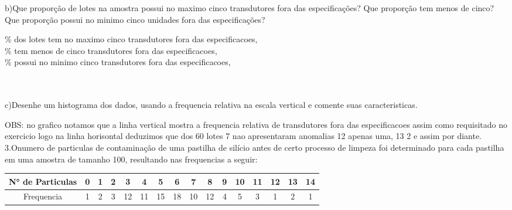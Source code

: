 \documentclass[12pt]{article}%
\begin{document}
 \color[rgb]{0.2,0.2,0.2}
  b)Que proporção de lotes na amostra possui no maximo cinco transdutores fora
 das especificações? Que proporção tem menos de cinco? Que proporção possui
 no minimo cinco unidades fora das especificações?\\
 \color[rgb]{0.6,0.2,0.2}
 
 \pgfmathresult\% dos lotes tem no maximo cinco transdutores fora das especificacoes, \\\pgfmathresult\% tem menos de cinco transdutores fora das especificacoes, \\\pgfmathresult\% possui no minimo cinco transdutores fora das especificacoes, 
 \color[rgb]{0.2,0.2,0.2}
 
\\\\ c)Desenhe um histograma dos dados, usando a frequencia relativa na escala vertical e comente suas caracteristicas.

\begin{center}
\end{center}
OBS: no grafico notamos que a linha vertical mostra a frequencia relativa de transdutores fora das especificacoes assim como requisitado no exercicio logo na linha horisontal deduzimos que dos 60 lotes 7 nao apresentaram anomalias 12 apenas uma, 13 2 e assim por diante.
\\
 3.Onumero de particulas de contaminação de uma pastilha de silício antes de certo
 processo de limpeza foi determinado para cada pastilha em uma amostra de tamanho
 100, resultando nas frequencias a seguir:
 \begin{center}
     \begin{tabular}{c|c|c|c|c|c|c|c|c|c|c|c|c|c|c|c}
     \hline
         N° de Particulas & 0 & 1 & 2 & 3&4&5&6&7&8&9&10&11&12&13&14 \\\hline
         Frequencia & 1&2&3&12&11&15&18&10&12&4&5&3&1&2&1\\\hline
     \end{tabular}
 \end{center}
\end{document}
